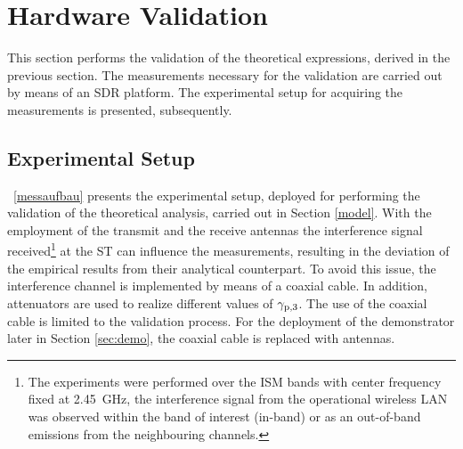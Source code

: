 \section{Hardware Validation}
\label{sec:val}
This section performs the validation of the theoretical expressions, derived in the previous section. The measurements necessary for the validation are carried out by means of an  SDR platform. The experimental setup for acquiring the measurements is presented, subsequently. 
 
\subsection{Experimental Setup}

\figurename~\ref{messaufbau} presents the experimental setup, deployed for performing the validation of the theoretical analysis, carried out in Section \ref{model}. %
With the employment of the transmit and the receive antennas the interference signal received\footnote{The experiments were performed over the ISM bands with center frequency fixed at \SI{2.45}{GHz}, the interference signal from the operational wireless LAN was observed within the band of interest (in-band) or as an out-of-band emissions from the neighbouring channels.} at the ST can influence the measurements, resulting in the deviation of the empirical results from their analytical counterpart. To avoid this issue, the interference channel is implemented by means of a coaxial cable. In addition, attenuators are used to realize different values of ${\gamma}_{\text{p,3}}$. The use of the coaxial cable is limited to the validation process. For the deployment of the demonstrator later in Section \ref{sec:demo}, the coaxial cable is replaced with antennas. %

